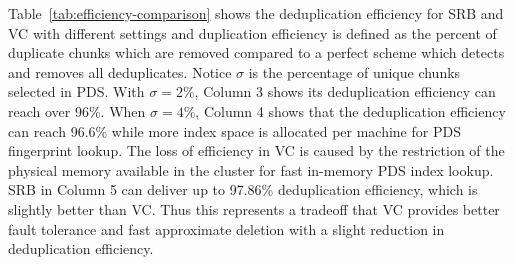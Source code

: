 Table~\ref{tab:efficiency-comparison} shows the deduplication efficiency for SRB and VC with different 
settings
and
duplication efficiency is defined as the percent of duplicate chunks which are removed
compared to a perfect scheme which detects and removes  all deduplicates. 
Notice $\sigma$ is the percentage of unique chunks selected in PDS.
With $\sigma =2\%$, Column 3 shows its 
deduplication efficiency can 
reach over 96\%.
When $\sigma=4\%$, Column 4 shows that the deduplication efficiency can reach 96.6\% while 
more index space is allocated  per machine for  PDS fingerprint lookup.
The loss of efficiency in VC is caused by the restriction of the physical memory available
in the cluster for fast in-memory PDS index lookup. 
SRB in Column 5 can deliver up to 97.86\% deduplication efficiency, which is slightly better than VC.
Thus this represents a tradeoff that VC provides better fault tolerance and fast approximate deletion
with a slight reduction in deduplication efficiency.



